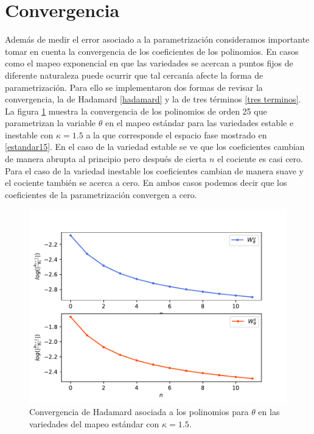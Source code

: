 \section{Convergencia}
Además de medir el error asociado a la parametrización consideramos importante tomar en cuenta la convergencia de los coeficientes de los polinomios. En casos como el mapeo exponencial en que las variedades se acercan a puntos fijos de diferente naturaleza puede ocurrir que tal cercanía afecte la forma de parametrización. Para ello se implementaron dos formas de revisar la convergencia, la de Hadamard \eqref{hadamard} y la de tres términos \eqref{tres terminos}. \\

La figura \ref{convergenciaEst15} muestra la convergencia de los polinomios de orden 25 que parametrizan la variable $\theta$ en el mapeo estándar para las variedades estable e inestable con $\kappa=1.5$ a la que corresponde el espacio fase mostrado en \ref{estandar15}. En el caso de la variedad estable se ve que los coeficientes cambian de manera abrupta al principio pero después de cierta $n$ el cociente es casi cero. Para el caso de la variedad inestable los coeficientes cambian de manera suave y el cociente también se acerca a cero. En ambos casos podemos decir que los coeficientes de la parametrización convergen a cero.  
\begin{figure}[H]
\centering
\includegraphics[scale=0.5]{converEst15}
\caption{Convergencia de Hadamard asociada a los polinomios para $\theta$ en las variedades del mapeo estándar con $\kappa=1.5$.}
\label{convergenciaEst15}
\end{figure}

